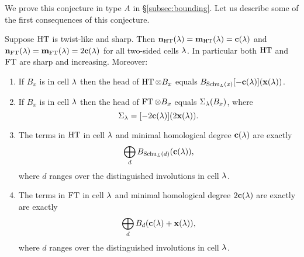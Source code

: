 We prove this conjecture in type $A$ in \S\ref{subsec:bounding}. Let us describe some of the first consequences of this conjecture.

\begin{prop}\label{prop:FTconsequence}
Suppose $\operatorname{HT}$ is twist-like and sharp. Then ${\mathbf n}_{\operatorname{HT}}(\lambda)={\mathbf m}_{\operatorname{HT}}(\lambda)=\mathbf{c}(\lambda)$ and ${\mathbf n}_{\operatorname{FT}}(\lambda)={\mathbf m}_{\operatorname{FT}}(\lambda)=2\mathbf{c}(\lambda)$ for all two-sided cells $\lambda$.  In particular both $\operatorname{HT}$ and $\operatorname{FT}$ are sharp and increasing.  Moreover:
\begin{enumerate}
\item If $B_x$ is in cell $\lambda$ then the head of $\operatorname{HT}\otimes B_x$ equals $B_{\operatorname{Schu}_L(x)}[-\mathbf{c}(\lambda)](\mathbf{x}(\lambda))$.
\item If $B_x$ is in cell $\lambda$ then the head of $\operatorname{FT}\otimes B_x$ equals $\Sigma_\lambda(B_{x})$, where
\[
\Sigma_\lambda=[-2\mathbf{c}(\lambda)](2\mathbf{x}(\lambda)).
\]
\item The terms in $\operatorname{HT}$ in cell $\lambda$ and minimal homological degree $\mathbf{c}(\lambda)$ are exactly
\[ \bigoplus_d B_{\operatorname{Schu}_L(d)}(\mathbf{c}(\lambda)), \] where $d$ ranges over the distinguished involutions in cell $\lambda$.
\item The terms in $\operatorname{FT}$ in cell $\lambda$ and minimal homological degree $2\mathbf{c}(\lambda)$ are exactly are exactly
\[ \bigoplus_d B_d(\mathbf{c}(\lambda) + \mathbf{x}(\lambda)), \] where $d$ ranges over the distinguished involutions in cell $\lambda$.
\end{enumerate}
\end{prop}

